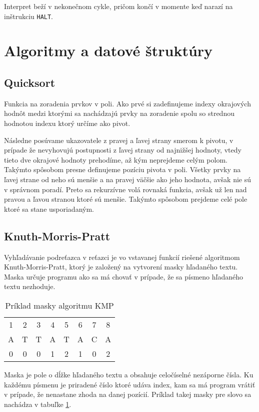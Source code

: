 \documentclass[12pt,a4paper,titlepage,final]{article}
\begin{document}
Interpret beží v nekonečnom cykle, pričom končí v momente keď narazí na inštrukciu
\texttt{HALT}.

\section{Algoritmy a datové štruktúry}
\subsection{Quicksort}
Funkcia na zoradenia prvkov v poli. Ako prvé si zadefinujeme indexy okrajových
hodnôt medzi ktorými sa nachádzajú prvky na zoradenie spolu so strednou hodnotou
indexu ktorý určíme ako pivot.

Následne posúvame ukazovatele  z pravej a ľavej strany smerom k pivotu,
 v prípade že nevyhovujú postupnosti z ľavej strany od najnižšej hodnoty, 
 vtedy tieto dve okrajové hodnoty prehodíme, až kým neprejdeme celým polom.
Takýmto spôsobom presne definujeme pozíciu pivota v poli. Všetky prvky na ľavej
 strane od neho sú menšie a na pravej väčšie ako jeho hodnota, avšak nie sú
 v správnom poradí. Preto sa rekurzívne volá rovnaká funkcia, avšak už len nad
 pravou a ľavou stranou ktoré sú menšie. Takýmto spôsobom prejdeme celé pole
 ktoré sa stane usporiadaným.

\subsection{Knuth-Morris-Pratt}
Vyhľadávanie podreťazca v reťazci je vo vstavanej funkcií riešené algoritmom
 Knuth-Morris-Pratt, ktorý je založený na vytvorení masky hľadaného textu.
Maska určuje programu ako sa má chovať v prípade, že sa písmeno hľadaného
 textu nezhoduje.
\begin{table}[H]
 \centering
 \begin{tabular}{cccccccc}
 	1 & 2 & 3 & 4 & 5 & 6 & 7 & 8 \\
 	A & T & T & A & T & A & C & A \\
 	0 & 0 & 0 & 1 & 2 & 1 & 0 & 2
 \end{tabular}
 \caption{Príklad masky algoritmu KMP}
 \label{tab:kmp}
\end{table}

Maska je pole o dĺžke hľadaného textu a obsahuje celočíselné nezáporne čísla.
Ku každému písmenu je priradené číslo ktoré udáva index, kam sa má program
 vrátiť v prípade, že nenastane zhoda na danej pozícií. Príklad takej masky
 pre slovo  sa nachádza v tabuľke \ref{tab:kmp}.
\end{document}
